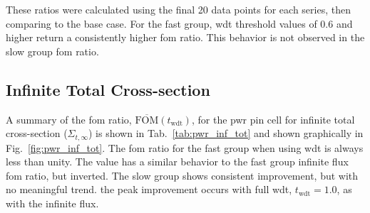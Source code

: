 These ratios were calculated using the final 20 data points for each
series, then comparing to the base case. For the fast group, \gls{wdt} threshold values
of 0.6 and higher return a consistently higher \gls{fom} ratio. This
behavior is not observed in the slow group \gls{fom} ratio.

\subsection{Infinite Total Cross-section}
\label{sec:pwr_inf_total}
A summary of the \gls{fom} ratio,
$\overline{\mathrm{FOM}}(t_{\mathrm{wdt}})$, for the \gls{pwr} pin
cell for infinite total cross-section ($\Sigma_{t,
  \infty}$) is shown in Tab.~\ref{tab:pwr_inf_tot} and shown
graphically in Fig.~\ref{fig:pwr_inf_tot}. The \gls{fom} ratio for the
fast group when using \gls{wdt} is always less than unity. The
value has a similar behavior to the fast group infinite flux \gls{fom}
ratio, but inverted. The slow group shows consistent improvement, but
with no meaningful trend. the peak improvement occurs with full
\gls{wdt}, $t_{\mathrm{wdt}} = 1.0$, as with the infinite flux.

